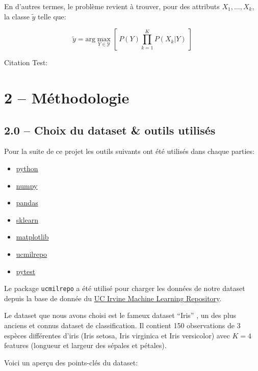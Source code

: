\documentclass[
]{article}
\providecommand{\tightlist}{%
  \setlength{\itemsep}{0pt}\setlength{\parskip}{0pt}}
\begin{document}
En d'autres termes, le problème revient à trouver, pour des attributs
\(X_1, \ldots, X_k\), la classe \(\tilde{y}\) telle que:

\[
\tilde{y} = \text{arg}\max_{Y \in \mathcal{Y}} \left[\  P(Y) \prod_{k = 1}^K{P(X_k | Y)}\  \right]
\]

Citation Test: \cite{LinearModels}

\hypertarget{muxe9thodologie}{%
\section{2 -- Méthodologie}\label{muxe9thodologie}}

\hypertarget{choix-du-dataset-outils-utilisuxe9s}{%
\subsection{2.0 -- Choix du dataset \& outils
utilisés}\label{choix-du-dataset-outils-utilisuxe9s}}

Pour la suite de ce projet les outils suivants ont été utilisés dans
chaque parties:

\begin{itemize}
\tightlist
\item
  \href{https://www.python.org/}{python}
\item
  \href{https://numpy.org/}{numpy}
\item
  \href{https://pandas.pydata.org/}{pandas}
\item
  \href{https://scikit-learn.org/stable/}{sklearn}
\item
  \href{https://matplotlib.org/}{matplotlib}
\item
  \href{https://github.com/uci-ml-repo/ucimlrepo}{ucmilrepo}
\item
  \href{https://docs.pytest.org/en/stable/}{pytest}
\end{itemize}

Le package \texttt{ucmilrepo} a été utilisé pour charger les données de
notre dataset depuis la base de donnée du
\href{https://archive.ics.uci.edu/ml/index}{UC Irvine Machine Learning
Repository}.

Le dataset que nous avons choisi est le fameux dataset ``Iris''
\cite{r.a.fisherIris1936}, un des plus anciens et connus dataset de
classification. Il contient 150 observations de 3 espèces différentes
d'iris (Iris setosa, Iris virginica et Iris versicolor) avec \(K = 4\)
features (longueur et largeur des sépales et pétales).

Voici un aperçu des points-clés du dataset:
\end{document}
